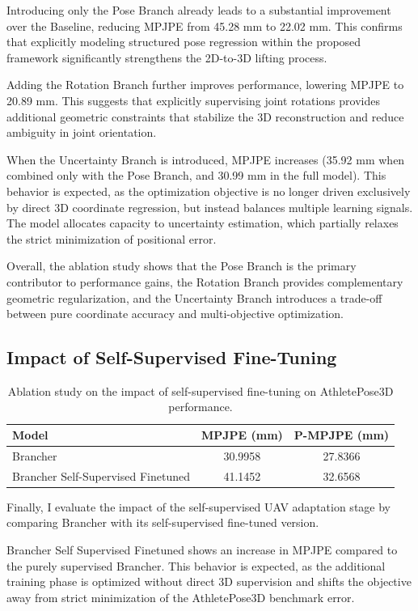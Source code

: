 Introducing only the Pose Branch already leads to a substantial improvement over the Baseline, reducing MPJPE from 45.28 mm to 22.02 mm. This confirms that explicitly modeling structured pose regression 
within the proposed framework significantly strengthens the 2D-to-3D lifting process.

Adding the Rotation Branch further improves performance, lowering MPJPE to 20.89 mm. This suggests that explicitly supervising joint rotations provides additional geometric constraints that stabilize the 
3D reconstruction and reduce ambiguity in joint orientation.

When the Uncertainty Branch is introduced, MPJPE increases (35.92 mm when combined only with the Pose Branch, and 30.99 mm in the full model). This behavior is expected, as the optimization objective is no 
longer driven exclusively by direct 3D coordinate regression, but instead balances multiple learning signals. The model allocates capacity to uncertainty estimation, which partially relaxes the strict 
minimization of positional error.

Overall, the ablation study shows that the Pose Branch is the primary contributor to performance gains, the Rotation Branch provides complementary geometric regularization, and the Uncertainty Branch 
introduces a trade-off between pure coordinate accuracy and multi-objective optimization.


\subsection{Impact of Self-Supervised Fine-Tuning}
\begin{table}[H]
\centering
\caption{Ablation study on the impact of self-supervised fine-tuning on AthletePose3D performance.}
\label{tab:results}
\begin{tabular}{lcc}
\hline
Model & MPJPE (mm) & P-MPJPE (mm) \\
\hline
Brancher & 30.9958 & 27.8366 \\
Brancher Self-Supervised Finetuned & 41.1452 & 32.6568 \\
\hline
\end{tabular}
\end{table}
Finally, I evaluate the impact of the self-supervised UAV adaptation stage by comparing Brancher with its self-supervised fine-tuned version.

Brancher Self Supervised Finetuned shows an increase in MPJPE compared to the purely supervised Brancher. This behavior is expected, as the additional training phase is optimized without direct 3D 
supervision and shifts the objective away from strict minimization of the AthletePose3D benchmark error.

